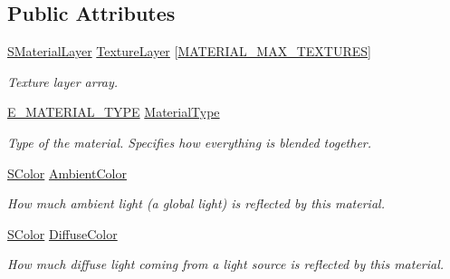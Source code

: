 \subsection*{Public Attributes}
\begin{DoxyCompactItemize}
\item 
\mbox{\label{classirr_1_1video_1_1SMaterial_a2a722a68bcc2cb3e779882785a409890}} 
\hyperlink{classirr_1_1video_1_1SMaterialLayer}{S\+Material\+Layer} \hyperlink{classirr_1_1video_1_1SMaterial_a2a722a68bcc2cb3e779882785a409890}{Texture\+Layer} \mbox{[}\hyperlink{namespaceirr_1_1video_ad41ca808200ca2e8e9d9326355020052}{M\+A\+T\+E\+R\+I\+A\+L\+\_\+\+M\+A\+X\+\_\+\+T\+E\+X\+T\+U\+R\+ES}\mbox{]}
\begin{DoxyCompactList}\small\item\em Texture layer array. \end{DoxyCompactList}\item 
\mbox{\label{classirr_1_1video_1_1SMaterial_a8cb63ab4b49ae1c61fbca8353e6b2f8a}} 
\hyperlink{namespaceirr_1_1video_ac8e9b6c66f7cebabd1a6d30cbc5430f1}{E\+\_\+\+M\+A\+T\+E\+R\+I\+A\+L\+\_\+\+T\+Y\+PE} \hyperlink{classirr_1_1video_1_1SMaterial_a8cb63ab4b49ae1c61fbca8353e6b2f8a}{Material\+Type}
\begin{DoxyCompactList}\small\item\em Type of the material. Specifies how everything is blended together. \end{DoxyCompactList}\item 
\hyperlink{classirr_1_1video_1_1SColor}{S\+Color} \hyperlink{classirr_1_1video_1_1SMaterial_a434c189b7c618c66f4d09118d30e6b4b}{Ambient\+Color}
\begin{DoxyCompactList}\small\item\em How much ambient light (a global light) is reflected by this material. \end{DoxyCompactList}\item 
\hyperlink{classirr_1_1video_1_1SColor}{S\+Color} \hyperlink{classirr_1_1video_1_1SMaterial_ac4e1aaf4751f7267eaf255496cc058df}{Diffuse\+Color}
\begin{DoxyCompactList}\small\item\em How much diffuse light coming from a light source is reflected by this material. \end{DoxyCompactList}\item 
\mbox{\label{classirr_1_1video_1_1SMaterial_a005f9acf8855681c21b3e3e7de67306f}} 

\end{DoxyCompactItemize}
